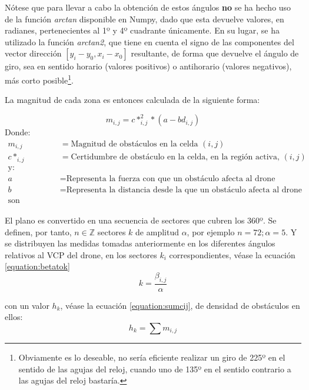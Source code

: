 Nótese que para llevar a cabo la obtención de estos ángulos \textbf{no} se ha hecho uso de la función \textit{arctan} disponible en Numpy, dado que esta devuelve valores, en radianes, pertenecientes al 1º y 4º cuadrante únicamente. En su lugar, se ha utilizado la función \textit{arctan2}, que tiene en cuenta el signo de las componentes del vector dirección $ [y_i - y_0 , x_i - x_0]$ resultante, de forma que devuelve el ángulo de giro, sea en sentido horario (valores positivos) o antihorario (valores negativos), más corto posible\footnote{Obviamente es lo deseable, no sería eficiente realizar un giro de 225º en el sentido de las agujas del reloj, cuando uno de 135º en el sentido contrario a las agujas del reloj bastaría.}.


La magnitud de cada zona es entonces calculada de la siguiente forma:

\begin{equation}
\label{equation:mij}
m_{i,j} = c*_{i,j}^2 * (a-bd_{i,j})
\end{equation}
Donde: 
\begin{align*}
m_{i,j}  &= \text{Magnitud de obstáculos en la celda $(i,j)$}\\
c*_{i,j} &= \text{Certidumbre de obstáculo en la celda, en la región activa, $(i,j)$}\\
\text{y:} \\
a &= \text{Representa la fuerza con que un obstáculo afecta al drone}\\
b &= \text{Representa la distancia desde la que un obstáculo afecta al drone}\\
\text{son positivos}
\end{align*}

El plano es convertido en una secuencia de sectores que cubren los 360º. Se definen, por tanto, $n \in \mathbb{Z}$ sectores $k$ de amplitud $\alpha$, por ejemplo $n=72; \alpha=5$. Y se distribuyen las medidas tomadas anteriormente en los diferentes ángulos relativos al VCP del drone, en los sectores $k_i$ correspondientes, véase la ecuación \ref{equation:betatok} 
\begin{equation}
\label{equation:betatok}
k =\frac{\beta_{i,j}}{\alpha}
\end{equation}

con un valor $h_k$, véase la ecuación \ref{equation:sumcij}, de densidad de obstáculos en ellos:
\begin{equation}
\label{equation:sumcij}
h_k = \sum m_{i,j}
\end{equation}


